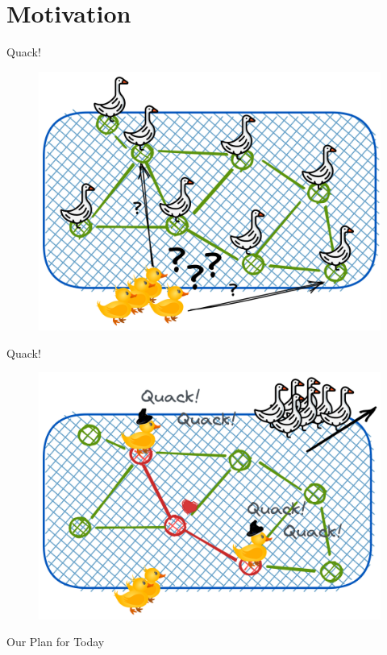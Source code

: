 
\section{Motivation}
\begin{frame}[c]{Quack!}
\begin{figure}[t]
    \centering
    \includegraphics[width=0.6\columnwidth]{../thesis/fig/excalidraw/lake-left.png}
\end{figure}
\end{frame}


\begin{frame}[c]{Quack!}
\begin{figure}[t]
    \centering
    \includegraphics[width=0.6\columnwidth]{../thesis/fig/excalidraw/lake-right.png}
\end{figure}
\end{frame}


\begin{frame}{Our Plan for Today}
    \tableofcontents
\end{frame}